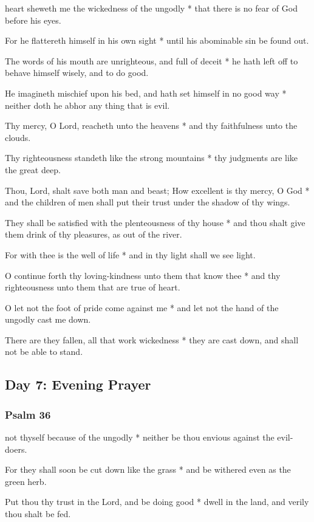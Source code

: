  heart sheweth me the wickedness of the ungodly * that there is no fear of God before his eyes.

For he flattereth himself in his own sight * until his abominable sin be found out.

The words of his mouth are unrighteous, and full of deceit * he hath left off to behave himself wisely, and to do good.

He imagineth mischief upon his bed, and hath set himself in no good way * neither doth he abhor any thing that is evil.

Thy mercy, O Lord, reacheth unto the heavens * and thy faithfulness unto the clouds.

Thy righteousness standeth like the strong mountains * thy judgments are like the great deep.

Thou, Lord, shalt save both man and beast; How excellent is thy mercy, O God * and the children of men shall put their trust under the shadow of thy wings.

They shall be satisfied with the plenteousness of thy house * and thou shalt give them drink of thy pleasures, as out of the river.

For with thee is the well of life * and in thy light shall we see light.

O continue forth thy loving-kindness unto them that know thee * and thy righteousness unto them that are true of heart.

O let not the foot of pride come against me * and let not the hand of the ungodly cast me down.

There are they fallen, all that work wickedness * they are cast down, and shall not be able to stand.

\subsection{Day 7: Evening Prayer}

\subsubsection{Psalm 36}


 not thyself because of the ungodly * neither be thou envious against the evil-doers.

For they shall soon be cut down like the grass * and be withered even as the green herb.

Put thou thy trust in the Lord, and be doing good * dwell in the land, and verily thou shalt be fed.

